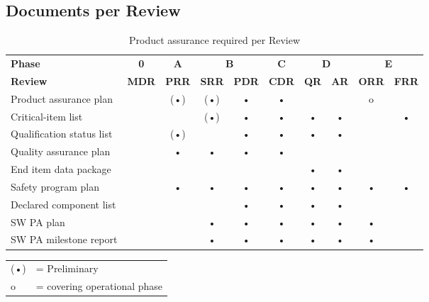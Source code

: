 \subsection{Documents per Review}
\begin{table}[h]
\centering
\begin{tabular}{l c c c c c c c c c}
\toprule
\textbf{Phase} & \textbf{0} & \textbf{A} & \multicolumn{2}{c}{\textbf{B}} & \textbf{C} & \multicolumn{2}{c}{\textbf{D}} & \multicolumn{2}{c}{\textbf{E}} \\
\textbf{Review} & \textbf{MDR} & \textbf{PRR} & \textbf{SRR} & \textbf{PDR} & \textbf{CDR} & \textbf{QR} & \textbf{AR} & \textbf{ORR} & \textbf{FRR} \\
\midrule
Product assurance plan     		&   &(•)&(•)& • & • &   &   & o &   \\
\hline
Critical-item list				&   &   &(•)& • & • & • & • &   & • \\
\hline
Qualification status list 		&   &(•)&   & • & • & • & • &   &   \\
\hline
Quality assurance plan          &   & • & • & • & • &   &   &   &   \\
\hline
End item data package           &   &   &   &   &   & • & • &   &   \\
\hline
Safety program plan             &   & • & • & • & • & • & • & • & • \\
\hline
Declared component list         &   &   &   & • & • & • & • &   &   \\
\hline
SW PA plan                      &   &   & • & • & • & • & • & • &   \\
\hline
SW PA milestone report          &   &   & • & • & • & • & • & • &   \\
\bottomrule
\end{tabular}
\caption{Product assurance required per Review}
\end{table}

\begin{tabular}{l l}
(•) &= Preliminary \\
o &= covering operational phase
\end{tabular}
